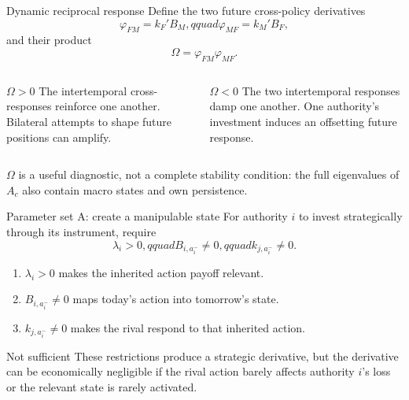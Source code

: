 \documentclass[10pt,aspectratio=169]{beamer}
\begin{document}
\begin{frame}{Dynamic reciprocal response}
Define the two future cross-policy derivatives
\begin{equation*}
\varphi_{FM}=k_F'B_M,qquad
\varphi_{MF}=k_M'B_F,
\end{equation*}
and their product
\begin{equation*}
\boxed{\Omega=\varphi_{FM}\varphi_{MF}.}
\end{equation*}
\begin{columns}[T,onlytextwidth]
\begin{block}{$\Omega>0$}
The intertemporal cross-responses reinforce one another. Bilateral attempts to
shape future positions can amplify.
\end{block}
\begin{block}{$\Omega<0$}
The two intertemporal responses damp one another. One authority's investment
induces an offsetting future response.
\end{block}
\end{columns}
\vfill
$\Omega$ is a useful diagnostic, not a complete stability condition: the full
eigenvalues of $A_c$ also contain macro states and own persistence.
\end{frame}

\begin{frame}{Parameter set A: create a manipulable state}
For authority $i$ to invest strategically through its instrument, require
\begin{equation*}
\boxed{\lambda_i>0,qquad B_{i,a_i^-}\ne0,qquad
k_{j,a_i^-}\ne0.}
\end{equation*}
\begin{enumerate}
  \item $\lambda_i>0$ makes the inherited action payoff relevant.
  \item $B_{i,a_i^-}\ne0$ maps today's action into tomorrow's state.
  \item $k_{j,a_i^-}\ne0$ makes the rival respond to that inherited action.
\end{enumerate}
\begin{alertblock}{Not sufficient}
These restrictions produce a strategic derivative, but the derivative can be
economically negligible if the rival action barely affects authority $i$'s
loss or the relevant state is rarely activated.
\end{alertblock}
\end{frame}
\end{document}
